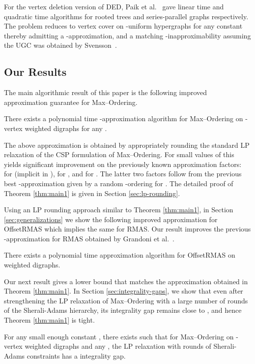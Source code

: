 \documentclass[oribibl]{llncs}
\newcommand{\maxk}{{\sc Max--Ordering}\xspace}
\newcommand{\mink}{{\sc DED}\xspace}
\newcommand{\rmas}{{\sc RMAS}\xspace}
\newcommand{\rmasoff}{{\sc OffsetRMAS}\xspace}
\begin{document}
For the vertex deletion version of 
\mink, Paik et al.~\cite{paik1994deleting} gave linear time and quadratic time 
algorithms for rooted trees and series-parallel
graphs respectively. 
The problem reduces to vertex cover on -uniform hypergraphs
for any constant  thereby admitting a -approximation, and a
matching -inapproximability assuming the UGC was obtained by
Svensson~\cite{svensson2012hardness}. 


\subsection{Our Results}
The main algorithmic result of this paper is the following improved
approximation guarantee for \maxk.
\begin{theorem}\label{thm:main1}
	There exists a polynomial time -approximation algorithm for \maxk on
	-vertex weighted digraphs for any .
\end{theorem}
The above approximation is obtained by appropriately rounding the
standard LP relaxation of the CSP formulation of \maxk. For small values of 
this yields significant improvement on
the previously known approximation factors:  for 
 (implicit in \cite{grandoni2015lp}),  for , 
and  for . The latter two factors follow from the previous best 
-approximation given by a random -ordering
for . The detailed proof of Theorem \ref{thm:main1} 
is given in
Section \ref{sec:lp-rounding}.

Using an LP rounding approach similar to Theorem \ref{thm:main1}, in
Section \ref{sec:generalizations} we
show the following improved approximation for \rmasoff which implies
the same for \rmas. Our result improves the 
previous -approximation for \rmas 
obtained by Grandoni et al.~\cite{grandoni2015lp}.
\begin{theorem}\label{thm:rmasoff}
	There exists a polynomial time
	 approximation algorithm 
	for \rmasoff on weighted digraphs. 
\end{theorem}

Our next result gives a lower bound that matches the approximation
obtained in Theorem \ref{thm:main1}. In Section \ref{sec:integrality-gaps}, we show that even after
strengthening the LP relaxation of \maxk with a large number of rounds of the
Sherali-Adams hierarchy, its integrality gap remains close to , and
hence Theorem \ref{thm:main1} is tight. 
\begin{theorem}\label{thm:main2}
	For any small enough constant , there exists  such that for \maxk on -vertex weighted digraphs and
	any , 
	the LP relaxation with  
	rounds of
	Sherali-Adams constraints has a  integrality gap.
\end{theorem}
\end{document}
